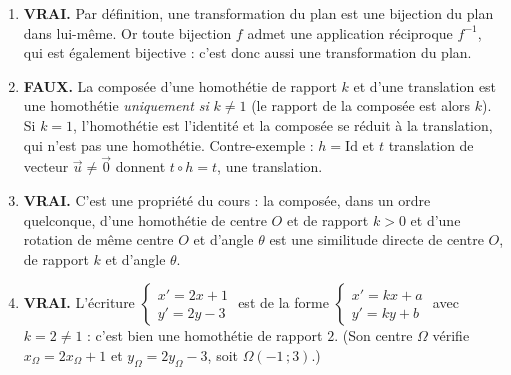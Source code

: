 \documentclass[11pt]{article}
\newcommand{\cle}[1]{{\popxbold\color{popdark}#1}}
\begin{document}
\begin{corrige}
\begin{enumerate}
\item \textbf{VRAI.} Par définition, une transformation du plan est une \cle{bijection} du plan dans lui-même. Or toute bijection $f$ admet une application réciproque $f^{-1}$, qui est également bijective : c'est donc aussi une transformation du plan.
\item \textbf{FAUX.} La composée d'une homothétie de rapport $k$ et d'une translation est une homothétie \emph{uniquement si} $k \neq 1$ (le rapport de la composée est alors $k$). Si $k = 1$, l'homothétie est l'identité et la composée se réduit à la translation, qui n'est pas une homothétie. Contre-exemple : $h = \mathrm{Id}$ et $t$ translation de vecteur $\vec{u} \neq \vec{0}$ donnent $t \circ h = t$, une translation.
\item \textbf{VRAI.} C'est une propriété du cours : la composée, dans un ordre quelconque, d'une homothétie de centre $O$ et de rapport $k > 0$ et d'une rotation de même centre $O$ et d'angle $\theta$ est une \cle{similitude directe} de centre $O$, de rapport $k$ et d'angle $\theta$.
\item \textbf{VRAI.} L'écriture $\begin{cases} x' = 2x + 1 \\ y' = 2y - 3 \end{cases}$ est de la forme $\begin{cases} x' = kx + a \\ y' = ky + b \end{cases}$ avec $k = 2 \neq 1$ : c'est bien une homothétie de rapport $2$. (Son centre $\Omega$ vérifie $x_\Omega = 2x_\Omega + 1$ et $y_\Omega = 2y_\Omega - 3$, soit $\Omega(-1\,;3)$.)
\end{enumerate}
\end{corrige}
\end{document}
